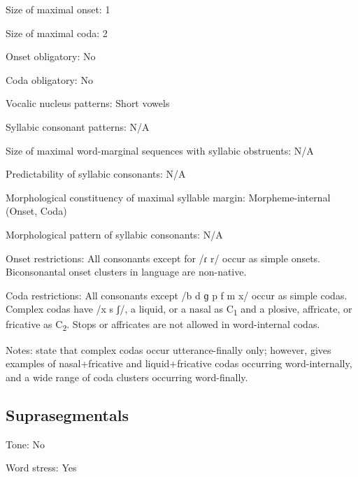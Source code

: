 {\begin{appendixdesc}
\item[Size of maximal onset:] 1

\item[Size of maximal coda:] 2

\item[Onset obligatory:] No

\item[Coda obligatory:] No

\item[Vocalic nucleus patterns:] Short vowels

\item[Syllabic consonant patterns:] N/A

\item[Size of maximal word-marginal sequences with syllabic obstruents:] N/A

\item[Predictability of syllabic consonants:] N/A

\item[Morphological constituency of maximal syllable margin:] Morpheme-internal (Onset, Coda)

\item[Morphological pattern of syllabic consonants:] N/A

\item[Onset restrictions:] All consonants except for /ɾ r/ occur as simple onsets. Biconsonantal onset clusters in language are non-native.

\item[Coda restrictions:] All consonants except /b d ɡ p f m x/ occur as simple codas. Complex codas have /x s ʃ/, a liquid, or a nasal as C\textsubscript{1} and a plosive, affricate, or fricative as C\textsubscript{2}. Stops or affricates are not allowed in word-internal codas.

\item[Notes:] \citet{SaltarelliEtAl1988} state that complex codas occur utterance-finally only; however, \citet{Hualde2003} gives examples of nasal+fricative and liquid+fricative codas occurring word-internally, and a wide range of coda clusters occurring word-finally.
\end{appendixdesc}
\subsection*{Suprasegmentals}
\begin{appendixdesc}
\item[Tone:] No

\item[Word stress:] Yes


\end{appendixdesc}}
